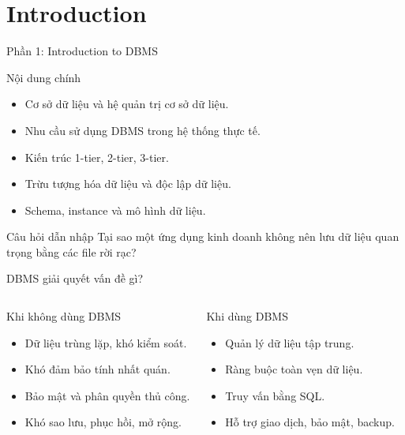 \documentclass[aspectratio=169,11pt]{beamer}
\begin{document}
\section{Introduction}
\begin{frame}{Phần 1: Introduction to DBMS}
\begin{block}{Nội dung chính}
\begin{itemize}
  \item Cơ sở dữ liệu và hệ quản trị cơ sở dữ liệu.
  \item Nhu cầu sử dụng DBMS trong hệ thống thực tế.
  \item Kiến trúc 1-tier, 2-tier, 3-tier.
  \item Trừu tượng hóa dữ liệu và độc lập dữ liệu.
  \item Schema, instance và mô hình dữ liệu.
\end{itemize}
\end{block}

\begin{alertblock}{Câu hỏi dẫn nhập}
Tại sao một ứng dụng kinh doanh không nên lưu dữ liệu quan trọng bằng các file rời rạc?
\end{alertblock}
\end{frame}

\begin{frame}{DBMS giải quyết vấn đề gì?}
\begin{columns}[T,onlytextwidth]
\begin{block}{Khi không dùng DBMS}
\begin{itemize}
  \item Dữ liệu trùng lặp, khó kiểm soát.
  \item Khó đảm bảo tính nhất quán.
  \item Bảo mật và phân quyền thủ công.
  \item Khó sao lưu, phục hồi, mở rộng.
\end{itemize}
\end{block}
\begin{block}{Khi dùng DBMS}
\begin{itemize}
  \item Quản lý dữ liệu tập trung.
  \item Ràng buộc toàn vẹn dữ liệu.
  \item Truy vấn bằng SQL.
  \item Hỗ trợ giao dịch, bảo mật, backup.
\end{itemize}
\end{block}
\end{columns}
\end{frame}
\end{document}
